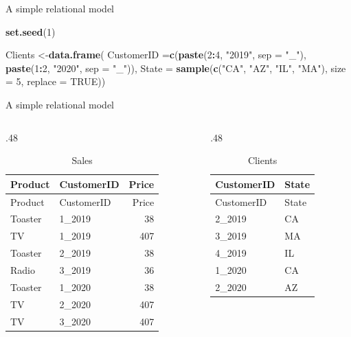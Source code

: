 \documentclass[ignorenonframetext,]{beamer}
\newenvironment{Shaded}{\begin{snugshade}}{\end{snugshade}}
\newcommand{\DataTypeTok}[1]{\textcolor[rgb]{0.13,0.29,0.53}{#1}}
\newcommand{\DecValTok}[1]{\textcolor[rgb]{0.00,0.00,0.81}{#1}}
\newcommand{\KeywordTok}[1]{\textcolor[rgb]{0.13,0.29,0.53}{\textbf{#1}}}
\newcommand{\NormalTok}[1]{#1}
\newcommand{\OperatorTok}[1]{\textcolor[rgb]{0.81,0.36,0.00}{\textbf{#1}}}
\newcommand{\OtherTok}[1]{\textcolor[rgb]{0.56,0.35,0.01}{#1}}
\newcommand{\StringTok}[1]{\textcolor[rgb]{0.31,0.60,0.02}{#1}}
\def\begincols{\begin{columns}}
\def\begincol{\begin{column}}
\def\endcol{\end{column}}
\def\endcols{\end{columns}}
\begin{document}
\begin{frame}[fragile]{A simple relational model}
\protect\hypertarget{a-simple-relational-model-1}{}

\begin{Shaded}
\begin{Highlighting}[]
\KeywordTok{set.seed}\NormalTok{(}\DecValTok{1}\NormalTok{)}

\NormalTok{Clients <-}\KeywordTok{data.frame}\NormalTok{(}
  \DataTypeTok{CustomerID =}\KeywordTok{c}\NormalTok{(}\KeywordTok{paste}\NormalTok{(}\DecValTok{2}\OperatorTok{:}\DecValTok{4}\NormalTok{, }\StringTok{"2019"}\NormalTok{, }\DataTypeTok{sep =} \StringTok{"_"}\NormalTok{),}
                \KeywordTok{paste}\NormalTok{(}\DecValTok{1}\OperatorTok{:}\DecValTok{2}\NormalTok{, }\StringTok{"2020"}\NormalTok{, }\DataTypeTok{sep =} \StringTok{"_"}\NormalTok{)),}
  \DataTypeTok{State =} \KeywordTok{sample}\NormalTok{(}\KeywordTok{c}\NormalTok{(}\StringTok{"CA"}\NormalTok{, }\StringTok{"AZ"}\NormalTok{, }\StringTok{"IL"}\NormalTok{, }\StringTok{"MA"}\NormalTok{),}
                \DataTypeTok{size =} \DecValTok{5}\NormalTok{, }\DataTypeTok{replace =} \OtherTok{TRUE}\NormalTok{))}
\end{Highlighting}
\end{Shaded}

\end{frame}

\begin{frame}{A simple relational model}
\protect\hypertarget{a-simple-relational-model-2}{}

\begincols
  \begincol{.48\textwidth}

\begin{longtable}[]{@{}llr@{}}
\caption{Sales}\tabularnewline
\toprule
Product & CustomerID & Price\tabularnewline
\midrule
\endfirsthead
\toprule
Product & CustomerID & Price\tabularnewline
\midrule
\endhead
Toaster & 1\_2019 & 38\tabularnewline
TV & 1\_2019 & 407\tabularnewline
Toaster & 2\_2019 & 38\tabularnewline
Radio & 3\_2019 & 36\tabularnewline
Toaster & 1\_2020 & 38\tabularnewline
TV & 2\_2020 & 407\tabularnewline
TV & 3\_2020 & 407\tabularnewline
\bottomrule
\end{longtable}

\endcol \begincol{.48\textwidth}

\begin{longtable}[]{@{}ll@{}}
\caption{Clients}\tabularnewline
\toprule
CustomerID & State\tabularnewline
\midrule
\endfirsthead
\toprule
CustomerID & State\tabularnewline
\midrule
\endhead
2\_2019 & CA\tabularnewline
3\_2019 & MA\tabularnewline
4\_2019 & IL\tabularnewline
1\_2020 & CA\tabularnewline
2\_2020 & AZ\tabularnewline
\bottomrule
\end{longtable}

\endcol \endcols

\end{frame}
\end{document}
